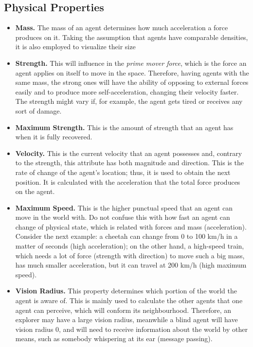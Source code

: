 \subsection{Physical Properties}

\begin{itemize}

\item{{\bf Mass.} The mass of an agent determines how much acceleration a force produces on it.
Taking the assumption that agents have comparable densities, it is also employed to visualize their size}

\item{{\bf Strength.} This will influence in the \emph{prime mover force}, which is the force an agent applies on itself to move in the space. Therefore, having agents with the same mass, the strong ones will have the ability of opposing to external forces easily and to produce more self-acceleration, changing their velocity faster. The strength might vary if, for example, the agent gets tired or receives any sort of damage.}

\item{{\bf Maximum Strength.} This is the amount of strength that an agent has when it is fully recovered.}

\item{{\bf Velocity.} This is the current velocity that an agent possesses and, contrary to the strength, this attribute has both magnitude and direction. This is the rate of change of the agent's location; thus, it is used to obtain the next position. It is calculated with the acceleration that the total force produces on the agent.}

\item{{\bf Maximum Speed.} This is the higher punctual speed that an agent can move in the world with. Do not confuse this with how fast an agent can change of physical state, which is related with forces and mass (acceleration). Consider the next example: a cheetah can change from 0 to 100 km/h in a matter of seconds (high acceleration); on the other hand, a high-speed train, which needs a lot of force (strength with direction) to move such a big mass, has much smaller acceleration, but it can travel at 200 km/h (high maximum speed).}

\item{{\bf Vision Radius.} This property determines which portion of the world the agent is aware of. This is mainly used to calculate the other agents that one agent can perceive, which will conform its neighbourhood. Therefore, an explorer may have a large vision radius, meanwhile a blind agent will have vision radius 0, and will need to receive information about the world by other means, such as somebody whispering at its ear (message passing).}

\end{itemize}

